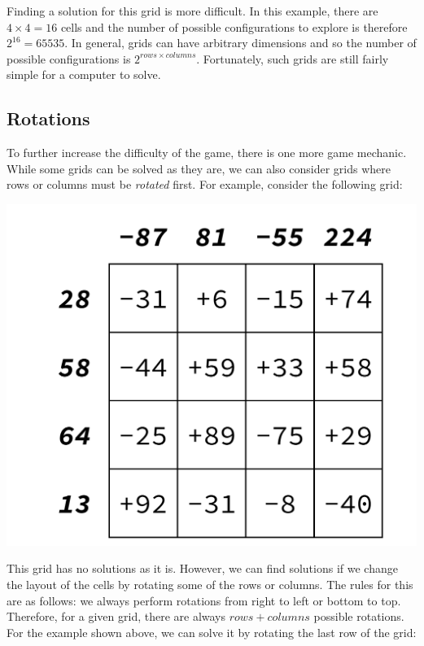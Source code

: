 Finding a solution for this grid is more difficult. In this example, there are $4 \times 4 = 16$ cells and the number of possible configurations to explore is therefore $2^{16} = 65535$. In general, grids can have arbitrary dimensions and so the number of possible configurations is $2^{\mathit{rows} \times \mathit{columns}}$. Fortunately, such grids are still fairly simple for a computer to solve.

\pagebreak
\subsection{Rotations}

To further increase the difficulty of the game, there is one more game mechanic. While some grids can be solved as they are, we can also consider grids where rows or columns must be \emph{rotated} first. For example, consider the following grid:
\begin{center}
	\includegraphics[scale=0.4,trim=0 30 0 30]{cswk/lac3.pdf}
\end{center}
This grid has no solutions as it is. However, we can find solutions if we change the layout of the cells by rotating some of the rows or columns. The rules for this are as follows: we always perform rotations from right to left or bottom to top. Therefore, for a given grid, there are always $\mathit{rows}+\mathit{columns}$ possible rotations. For the example shown above, we can solve it by rotating the last row of the grid:
